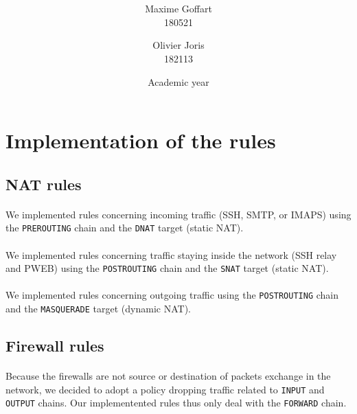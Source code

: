 \documentclass[a4paper, 11pt, oneside]{article}
\title{\ClassName\\\vspace*{0.8cm}\ProjectName\vspace{1cm}}
\author{Maxime Goffart \\180521 \and Olivier Joris\\182113}
\date{\vspace{1cm}Academic year \AcademicYear}
\begin{document}

\begin{titlingpage}
{\let\newpage\relax\maketitle}
\end{titlingpage}

\newpage


\section{Implementation of the rules}

\subsection{NAT rules}

\paragraph{}We implemented rules concerning incoming traffic (SSH, SMTP, or IMAPS) using the \texttt{PREROUTING} chain and the \texttt{DNAT} target (static NAT).

\paragraph{}We implemented rules concerning traffic staying inside the network (SSH relay and PWEB) using the \texttt{POSTROUTING} chain and the \texttt{SNAT} target (static NAT).

\paragraph{}We implemented rules concerning outgoing traffic using the \texttt{POSTROUTING} chain and the \texttt{MASQUERADE} target (dynamic NAT).

\subsection{Firewall rules}

\paragraph{}Because the firewalls are not source or destination of packets exchange in the network, we decided to adopt a policy dropping traffic related to \texttt{INPUT} and \texttt{OUTPUT} chains. Our implementented rules thus only deal with the \texttt{FORWARD} chain.
\end{document}
